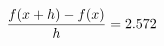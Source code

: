 \documentclass[preview]{standalone}
\begin{document}
\begin{align*}
\special{dvisvgm:raw <g id='unique000'>}\frac{f(x+h)-f(x)}{h} = 2.572\special{dvisvgm:raw </g>}
\end{align*}
\end{document}
